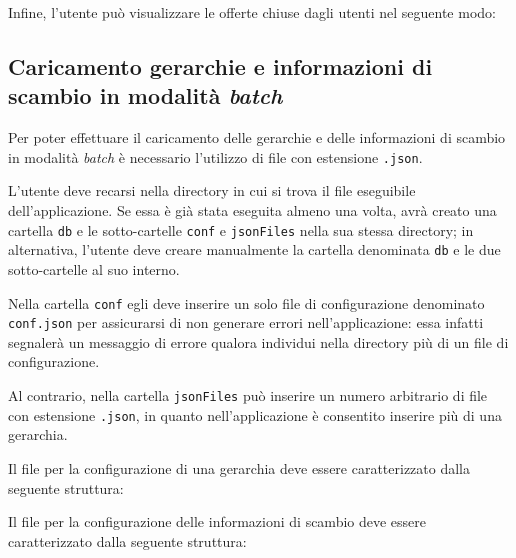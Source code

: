 Infine, l'utente può visualizzare le offerte chiuse dagli utenti nel seguente modo:


\subsection{Caricamento gerarchie e informazioni di scambio in modalità \textit{batch}}
Per poter effettuare il caricamento delle gerarchie e delle informazioni di scambio in modalità \textit{batch} è necessario l'utilizzo di file con estensione \texttt{.json}. 

L'utente deve recarsi nella directory in cui si trova il file eseguibile dell'applicazione. Se essa è già stata eseguita almeno una volta, avrà creato una cartella \texttt{db} e le sotto-cartelle \texttt{conf} e \texttt{jsonFiles} nella sua stessa directory; in alternativa, l'utente deve creare manualmente la cartella denominata \texttt{db} e le due sotto-cartelle al suo interno.

Nella cartella \texttt{conf} egli deve inserire un solo file di configurazione denominato \texttt{conf.json} per assicurarsi di non generare errori nell'applicazione: essa infatti segnalerà un messaggio di errore qualora individui nella directory più di un file di configurazione. 

Al contrario, nella cartella \texttt{jsonFiles} può inserire un numero arbitrario di file con estensione \texttt{.json}, in quanto nell'applicazione è consentito inserire più di una gerarchia. 

Il file per la configurazione di una gerarchia deve essere caratterizzato dalla seguente struttura:


Il file per la configurazione delle informazioni di scambio deve essere caratterizzato dalla seguente struttura:
